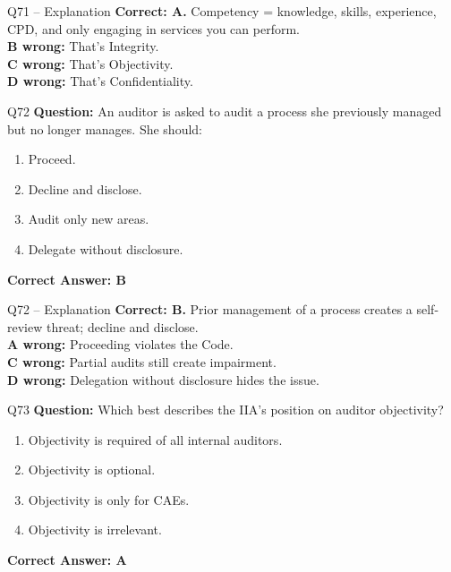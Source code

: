 \documentclass[aspectratio=169,10pt]{beamer}
\begin{document}
	\begin{frame}[t]{Q71 -- Explanation}
		\small
		\textbf{Correct: A.} Competency = knowledge, skills, experience, CPD, and only engaging in services you can perform. \\[4pt]
		\textbf{B wrong:} That's Integrity. \\[2pt]
		\textbf{C wrong:} That's Objectivity. \\[2pt]
		\textbf{D wrong:} That's Confidentiality.
	\end{frame}
	
	\begin{frame}[t]{Q72}
		\small
		\textbf{Question:} An auditor is asked to audit a process she previously managed but no longer manages. She should:
		\begin{enumerate}[label=\Alph*.,itemsep=1pt,topsep=2pt]
			\item Proceed.
			\item Decline and disclose.
			\item Audit only new areas.
			\item Delegate without disclosure.
		\end{enumerate}
		\vspace{4pt}
		\textbf{Correct Answer: B}
	\end{frame}
	
	\begin{frame}[t]{Q72 -- Explanation}
		\small
		\textbf{Correct: B.} Prior management of a process creates a self-review threat; decline and disclose. \\[4pt]
		\textbf{A wrong:} Proceeding violates the Code. \\[2pt]
		\textbf{C wrong:} Partial audits still create impairment. \\[2pt]
		\textbf{D wrong:} Delegation without disclosure hides the issue.
	\end{frame}
	
	\begin{frame}[t]{Q73}
		\small
		\textbf{Question:} Which best describes the IIA's position on auditor objectivity?
		\begin{enumerate}[label=\Alph*.,itemsep=1pt,topsep=2pt]
			\item Objectivity is required of all internal auditors.
			\item Objectivity is optional.
			\item Objectivity is only for CAEs.
			\item Objectivity is irrelevant.
		\end{enumerate}
		\vspace{4pt}
		\textbf{Correct Answer: A}
	\end{frame}
	
\end{document}
